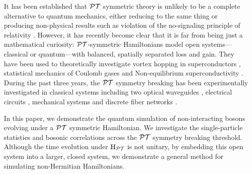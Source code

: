It has been established that \(\mathcal{PT}\) symmetric theory is unlikely to be a
complete alternative to quantum mechanics, either reducing to the same thing
\cite{mostafazadeh-jmathphys-43-205} or producing non-physical results such as
violation of the no-signaling principle of relativity \cite{lee-prl-112-130404}.
However, it has recently become clear that it is far from being just a
mathematical curiosity: \(\mathcal{PT}\)-symmetric Hamiltonians model open
systems---classical or quantum---with balanced, spatially separated loss and
gain. They have been used to theoretically investigate vortex hopping in
superconductors \cite{naomichi-physrevlett-77-570},
statistical mechanics of Coulomb gases \cite{gulden-jetp-117-517} and
Non-equilibrium superconductivity \cite{rubinstein-physrevlett-99-167003,
serbyn-physrevb-87-020501}. During the past three years, the \(\mathcal{PT}\)
symmetry breaking has been experimentally investigated in classical systems
including two optical waveguides \cite{pt-ruter}, electrical circuits
\cite{schindler-physreva-84-040101}, mechanical systems
\cite{bender-amjphys-81-173} and discrete fiber networks
\cite{pt-regensburger}.

In this paper, we demonstrate the quantum simulation of non-interacting bosons
evolving under a \(\mathcal{PT}\) symmetric
Hamiltonian. We investigate the single-particle statistics and bosonic
correlations across the \(\mathcal{PT}\) symmetry breaking threshold. Although the time
evolution under \(\mathrm{H}_{\mathcal{PT}}\) is not unitary, by embedding this open system
into a larger, closed system, we demonstrate a general method for simulating
non-Hermitian Hamiltonians.

